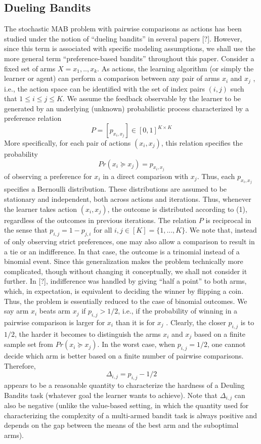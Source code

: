 \documentclass{llncs}
\begin{document}
	\subsection{Dueling Bandits}
		The stochastic MAB problem with pairwise comparisons as actions has been studied under the notion of “dueling bandits” in several papers [?].
		However, since this term is associated with specific modeling assumptions, we shall use the more general term “preference-based bandits” throughout this paper.
		Consider a fixed set of arms $X = {x_1,..,x_k}$. 
		As actions, the learning algorithm (or simply the learner or agent) can perform a comparison between any pair of arms $x_i$ and $x_j$ , i.e., the action space can be identified with the set of index pairs $(i, j)$ such that $1 \leq i \leq j \leq K$. 
		We assume the feedback observable by the learner to be generated by an underlying (unknown) probabilistic process characterized by a preference relation
		$$P = [p_{x_i,x_j}] \in [0,1]^{K \times K} $$
		More specifically, for each pair of actions $(x_i ,x_j)$, this relation specifies the probability
		\begin{equation}
		Pr(x_i \succeq x_j) = p_{x_i,x_j}
		\end{equation}
		of observing a preference for $x_i$ in a direct comparison with $x_j$. 
		Thus, each $p_{x_i,x_j}$ specifies a Bernoulli distribution.
		These distributions are assumed to be stationary and independent, both across actions and iterations. 
		Thus, whenever the learner takes action $(x_i ,x_j)$, the outcome is distributed according to (1), regardless
of the outcomes in previous iterations.
		The relation $P$ is reciprocal in the sense that $p_{i,j} = 1-p_{j,i}$ for all $i, j \in [K] = \{1, . . . , K\}$.  
		We note that, instead of only observing strict preferences, one may also allow a comparison to result in a tie or an indifference. 
		In that case, the outcome is a trinomial instead of a binomial event. 
		Since this generalization makes the problem technically more complicated, though without changing it conceptually, we shall not consider it further. 
		In [?], indifference was handled by giving “half a point” to both arms, which, in expectation, is equivalent to deciding the winner by flipping a coin. 
		Thus, the problem is essentially reduced to the case of binomial outcomes.
		We say arm $x_i$ beats arm $x_j$ if $p_{i,j} > 1/2$, i.e., if the probability of winning in a pairwise comparison is larger for $x_i$ than it is for $x_j$ . 
		Clearly, the closer $p_{i,j}$ is to $1/2$, the harder it becomes to distinguish the arms $x_i$ and $x_j$ based on a finite sample set from $Pr(x_i \succeq x_j)$.
		 In the worst case, when $p_{i,j} = 1/2$, one cannot decide which arm is better based on a finite number of pairwise comparisons. 
		 Therefore,
		 $$ \Delta_{i,j} = p_{i,j} - 1/2$$
		 appears to be a reasonable quantity to characterize the hardness of a Deuling Bandits task (whatever goal the learner wants to achieve).
		 Note that $\Delta_{i,j}$ can also be negative (unlike the value-based setting, in which the quantity used for characterizing the complexity of a multi-armed bandit task is always positive and depends on the gap between the means of the best arm and the suboptimal arms).
		 
\end{document}
